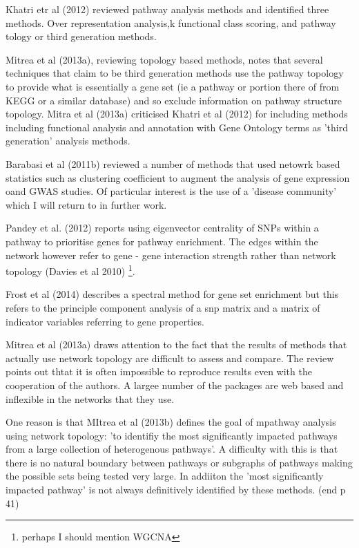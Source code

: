 Khatri etr al (2012) reviewed pathway analysis methods and identified three methods. Over representation analysis,k functional class scoring, and pathway tology or third generation methods.

Mitrea et al (2013a), reviewing topology based methods, notes that several techniques that claim to be third generation methods use the pathway topology to provide what is essentially a gene set (ie a pathway or portion there of from KEGG or a similar database) and so exclude information on pathway structure topology. Mitra et al (2013a) criticised Khatri et al (2012) for including methods including functional analysis and annotation with Gene Ontology terms as 'third generation' analysis methods.

Barabasi et al (2011b) reviewed a number of methods that used netowrk based statistics such as clustering coefficient to augment the analysis of gene expression oand GWAS studies. Of particular interest is the use of a 'disease community' which I will return to in further work. 

Pandey et al. (2012) reports using eigenvector centrality of SNPs within a pathway to prioritise genes for pathway enrichment. The edges within the network however refer to gene - gene interaction strength rather than network topology (Davies et al 2010) \footnote{perhaps I should mention WGCNA}.

Frost et al (2014) describes a spectral method for gene set enrichment but this refers to the principle component analysis of a snp matrix and a matrix of indicator variables referring to gene properties.

Mitrea et al (2013a) draws attention to the fact that the results of methods that actually use network topology are difficult to assess and compare. The review points out thtat it is often impossible to reproduce results even with the cooperation of the authors. A largee number of the packages are web based and inflexible in the networks that they use.

One reason is that MItrea et al (2013b) defines the goal of mpathway analysis using network topology: 'to identifiy the most significantly impacted pathways from a large collection of heterogenous pathways'. A difficulty with this is that there is no natural boundary between pathways or subgraphs of pathways making the possible sets being tested very large. In addiiton the 'most significantly impacted pathway' is not always definitively identified by these methods.  (end p 41)

